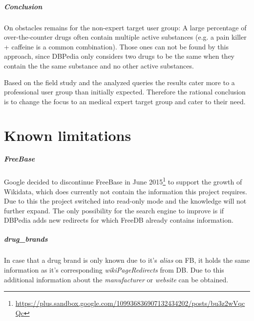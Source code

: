 \documentclass[11pt,titlepage,oneside,openany]{book}
\begin{document}
\paragraph{Conclusion}
\label{conclusion}

On obstacles remains for the non-expert target user group: 
A large percentage of over-the-counter drugs often contain multiple active substances (e.g. a pain killer + caffeine is a common combination). Those ones can not be found by this approach, since DBPedia only considers two drugs to be the same when they contain the the same substance and no other active substances.

Based on the field study and the analyzed queries the results cater more to a professional user group than initially expected. Therefore the rational conclusion is to change the focus to an medical expert target group and cater to their need.



\label{ex:ecotrin}


\chapter{Known limitations}
\label{cha:limiations}




\paragraph{FreeBase}
\label{prob:freebase}
Google decided to discontinue FreeBase in June 2015\footnote{\url{https://plus.sandbox.google.com/109936836907132434202/posts/bu3z2wVqcQc}} to support the growth of Wikidata, which does currently not contain the information this project requires. Due to this the project switched into read-only mode and the knowledge will not further expand. The only possibility for the search engine to improve is if DBPedia adds new redirects for which FreeDB already contains information. 


\paragraph{drug\_brands}
\label{limitations:fb_drugs} 
In case that a drug brand is only known due to it's \textit{alias} on FB, it holds the same information as it's corresponding \textit{wikiPageRedirects} from DB. Due to this additional information about the \textit{manufacturer} or \textit{website} can be obtained.
\end{document}
